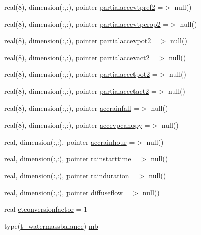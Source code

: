 \begin{DoxyCompactItemize}
\item 
real(8), dimension(\+:,\+:), pointer \mbox{\hyperlink{structmodulebasin_1_1t__basin_af8bf0098a80a86606431c38b3d68f553}{partialaccevtpref2}} =$>$ null()
\item 
real(8), dimension(\+:,\+:), pointer \mbox{\hyperlink{structmodulebasin_1_1t__basin_a306d174cfb1c58864d100fb2dcaae903}{partialaccevtpcrop2}} =$>$ null()
\item 
real(8), dimension(\+:,\+:), pointer \mbox{\hyperlink{structmodulebasin_1_1t__basin_a9164afae87902041194830059278ebc4}{partialaccevpot2}} =$>$ null()
\item 
real(8), dimension(\+:,\+:), pointer \mbox{\hyperlink{structmodulebasin_1_1t__basin_af6910e0ccfff90068cce0db421353536}{partialaccevact2}} =$>$ null()
\item 
real(8), dimension(\+:,\+:), pointer \mbox{\hyperlink{structmodulebasin_1_1t__basin_a10f10087a3e2a5cb108ee8550e5fc9b6}{partialaccetpot2}} =$>$ null()
\item 
real(8), dimension(\+:,\+:), pointer \mbox{\hyperlink{structmodulebasin_1_1t__basin_a16009091476a4e42740645f2f6c58331}{partialaccetact2}} =$>$ null()
\item 
real(8), dimension(\+:,\+:), pointer \mbox{\hyperlink{structmodulebasin_1_1t__basin_a704d22cdcc513e449d3db1e0ca2e8aec}{accrainfall}} =$>$ null()
\item 
real(8), dimension(\+:,\+:), pointer \mbox{\hyperlink{structmodulebasin_1_1t__basin_a882101757e31b97c7175ac79be4c1e87}{accevpcanopy}} =$>$ null()
\item 
real, dimension(\+:,\+:), pointer \mbox{\hyperlink{structmodulebasin_1_1t__basin_afa401ac56fb655c4555ae1ca0134c897}{accrainhour}} =$>$ null()
\item 
real, dimension(\+:,\+:), pointer \mbox{\hyperlink{structmodulebasin_1_1t__basin_a83649951b2a95ec428509a2f62760281}{rainstarttime}} =$>$ null()
\item 
real, dimension(\+:,\+:), pointer \mbox{\hyperlink{structmodulebasin_1_1t__basin_aa01d54a53adf08f5b61ca0c92a8d1919}{rainduration}} =$>$ null()
\item 
real, dimension(\+:,\+:), pointer \mbox{\hyperlink{structmodulebasin_1_1t__basin_a94fb881811a70088cef14f5af4492a9e}{diffuseflow}} =$>$ null()
\item 
real \mbox{\hyperlink{structmodulebasin_1_1t__basin_abe3abaf0e1c45510336a2ff66eda3e1d}{etconversionfactor}} = 1
\item 
type(\mbox{\hyperlink{structmodulebasin_1_1t__watermassbalance}{t\+\_\+watermassbalance}}) \mbox{\hyperlink{structmodulebasin_1_1t__basin_ad8b6f1433a915c0a8fbabea4a53efc1f}{mb}}

\end{DoxyCompactItemize}
